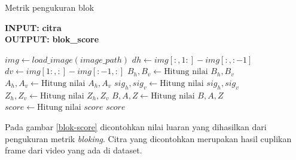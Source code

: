 \begin{algorithm}
	\caption{Metrik pengukuran blok}
	\label{metrik-blok}
	\begin{flushleft}
		\textbf{INPUT:} \textbf{citra}\\
		\textbf{OUTPUT:}	\textbf{blok\_score}
	\end{flushleft}
	\begin{algorithmic}[1]
		\State $img \gets load\_image(image\_path)$ 
		\State $dh \gets img[:, 1:] - img[:, :-1]$ 
		\State $dv \gets img[1:, :] - img[:-1, :]$ 
		\State $B_h, B_v \gets \text{Hitung nilai }B_h, B_v$ 
		\State $A_h, A_v \gets \text{Hitung nilai }A_h, A_v$
		\State $sig_h, sig_v \gets \text{Hitung nilai }sig_h, sig_v$ 
		\State $Z_h, Z_v \gets \text{Hitung nilai }Z_h, Z_v$ 
		\State $B, A, Z \gets \text{Hitung nilai }B, A, Z$ 
		\State $score \gets \text{Hitung nilai }score$ 
		\State \Return $score$
		\EndFunction
	\end{algorithmic}
\end{algorithm}

 Pada gambar \ref{blok-score} dicontohkan nilai luaran yang dihasilkan dari pengukuran metrik \textit{bloking}. Citra yang dicontohkan merupakan hasil cuplikan frame dari video yang ada di dataset.



